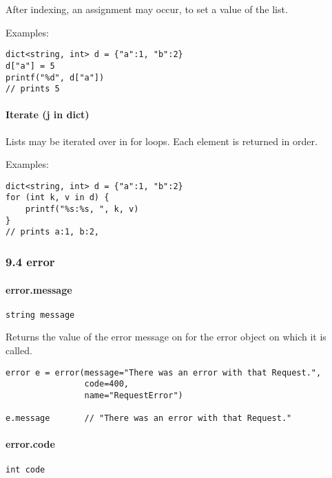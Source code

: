 \documentclass[]{article}
\begin{document}
After indexing, an assignment may occur, to set a value of the list.

Examples:

\begin{verbatim}
dict<string, int> d = {"a":1, "b":2}
d["a"] = 5
printf("%d", d["a"]) 
// prints 5
\end{verbatim}

\paragraph{Iterate (j in dict)}\label{iterate-j-in-dict}

Lists may be iterated over in for loops. Each element is returned in
order.

Examples:

\begin{verbatim}
dict<string, int> d = {"a":1, "b":2}
for (int k, v in d) {
    printf("%s:%s, ", k, v)
} 
// prints a:1, b:2, 
\end{verbatim}

\subsubsection{9.4 error}\label{error}

\paragraph{error.message}\label{error.message}

\begin{verbatim}
string message
\end{verbatim}

Returns the value of the error message on for the error object on which
it is called.

\begin{verbatim}
error e = error(message="There was an error with that Request.",
                code=400,
                name="RequestError")

e.message       // "There was an error with that Request."
\end{verbatim}

\paragraph{error.code}\label{error.code}

\begin{verbatim}
int code
\end{verbatim}
\end{document}
